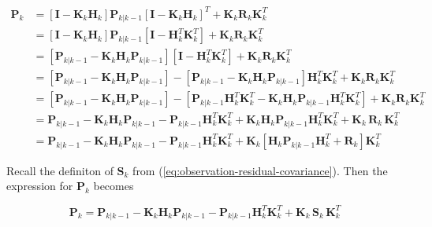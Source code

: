 \documentclass[12pt]{article}
\begin{document}
\begin{equation*}
    \begin{aligned}
        \mathbf{P}_{k} &= \left[ \mathbf{I} - \mathbf{K}_k \mathbf{H}_k \right] \mathbf{P}_{k|k-1} \left[ \mathbf{I} - \mathbf{K}_k \mathbf{H}_k \right]^T
          + \mathbf{K}_k \mathbf{R}_k \mathbf{K}_k^T \\
        &= \left[ \mathbf{I} - \mathbf{K}_k \mathbf{H}_k \right] \mathbf{P}_{k|k-1} \left[ \mathbf{I} - \mathbf{H}_k^T \mathbf{K}_k^T \right]
          + \mathbf{K}_k \mathbf{R}_k \mathbf{K}_k^T \\
        &= \left[ \mathbf{P}_{k|k-1} - \mathbf{K}_k \mathbf{H}_k \mathbf{P}_{k|k-1} \right] \left[ \mathbf{I} - \mathbf{H}_k^T \mathbf{K}_k^T \right]
          + \mathbf{K}_k \mathbf{R}_k \mathbf{K}_k^T \\
        &= \left[ \mathbf{P}_{k|k-1} - \mathbf{K}_k \mathbf{H}_k \mathbf{P}_{k|k-1} \right]
          - \left[ \mathbf{P}_{k|k-1} - \mathbf{K}_k \mathbf{H}_k \mathbf{P}_{k|k-1} \right] \mathbf{H}_k^T \mathbf{K}_k^T
          + \mathbf{K}_k \mathbf{R}_k \mathbf{K}_k^T \\
        &= \left[ \mathbf{P}_{k|k-1} - \mathbf{K}_k \mathbf{H}_k \mathbf{P}_{k|k-1} \right]
          - \left[ \mathbf{P}_{k|k-1} \mathbf{H}_k^T \mathbf{K}_k^T - \mathbf{K}_k \mathbf{H}_k \mathbf{P}_{k|k-1} \mathbf{H}_k^T \mathbf{K}_k^T \right]
          + \mathbf{K}_k \mathbf{R}_k \mathbf{K}_k^T \\
        &= \mathbf{P}_{k|k-1} - \mathbf{K}_k \mathbf{H}_k \mathbf{P}_{k|k-1}
          - \mathbf{P}_{k|k-1} \mathbf{H}_k^T \mathbf{K}_k^T + \mathbf{K}_k \mathbf{H}_k \mathbf{P}_{k|k-1} \mathbf{H}_k^T \mathbf{K}_k^T
          + \mathbf{K}_k \, \mathbf{R}_k \, \mathbf{K}_k^T \\
        &= \mathbf{P}_{k|k-1} - \mathbf{K}_k \mathbf{H}_k \mathbf{P}_{k|k-1} - \mathbf{P}_{k|k-1} \mathbf{H}_k^T \mathbf{K}_k^T
          + \mathbf{K}_k \left[ \mathbf{H}_k \mathbf{P}_{k|k-1} \mathbf{H}_k^T + \mathbf{R}_k \right] \mathbf{K}_k^T
    \end{aligned}
\end{equation*}

Recall the definiton of $\mathbf{S}_k$ from (\ref{eq:observation-residual-covariance}).
Then the expression for $\mathbf{P}_k$ becomes

\begin{equation}
    \mathbf{P}_{k} = \mathbf{P}_{k|k-1} - \mathbf{K}_k \mathbf{H}_k \mathbf{P}_{k|k-1} - \mathbf{P}_{k|k-1} \mathbf{H}_k^T \mathbf{K}_k^T
    + \mathbf{K}_k \, \mathbf{S}_k \, \mathbf{K}_k^T
    \label{eq:state-correction-covariance-interim}
\end{equation}
\end{document}
